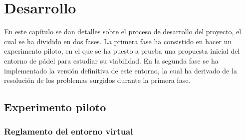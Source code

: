 \chapter{Desarrollo}\label{chapter:desarrollo}

En este capítulo se dan detalles sobre el proceso de desarrollo del proyecto, el cual se ha dividido en dos fases. La primera fase ha consistido en hacer un experimento piloto, en el que se ha puesto a prueba una propuesta inicial del entorno de pádel para estudiar su viabilidad. En la segunda fase se ha implementado la versión definitiva de este entorno, la cual ha derivado de la resolución de los problemas surgidos durante la primera fase.

\section{Experimento piloto}

\subsection{Reglamento del entorno virtual}

